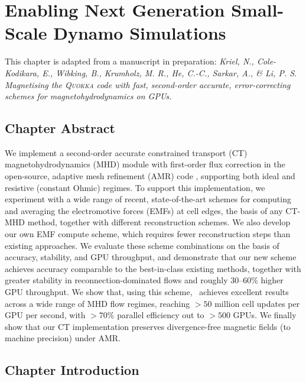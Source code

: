 \chapter{Enabling Next Generation Small-Scale Dynamo Simulations}
\label{chapter:quokka}

\noindent\hfill\parbox{0.75\textwidth}{\raggedleft
This chapter is adapted from a manuscript in preparation:
\textit{Kriel, N., Cole-Kodikara, E., Wibking, B., Krumholz, M. R., He, C.-C., Sarkar, A., \& Li, P. S. Magnetising the \textsc{Quokka} code with fast, second-order accurate, error-correcting schemes for magnetohydrodynamics on GPUs.}
}\par

\section{Chapter Abstract}

We implement a second-order accurate constrained transport (CT) magnetohydrodynamics (MHD) module with first-order flux correction in the open-source, adaptive mesh refinement (AMR) code \quokka, supporting both ideal and resistive (constant Ohmic) regimes. To support this implementation, we experiment with a wide range of recent, state-of-the-art schemes for computing and averaging the electromotive forces (EMFs) at cell edges, the basis of any CT-MHD method, together with different reconstruction schemes. We also develop our own EMF compute scheme, which requires fewer reconstruction steps than existing approaches. We evaluate these scheme combinations on the basis of accuracy, stability, and GPU throughput, and demonstrate that our new scheme achieves accuracy comparable to the best-in-class existing methods, together with greater stability in reconnection-dominated flows and roughly $30$--$60\%$ higher GPU throughput. We show that, using this scheme, \quokka~achieves excellent results across a wide range of MHD flow regimes, reaching $>50$ million cell updates per GPU per second, with $>70\%$ parallel efficiency out to $>500$ GPUs. We finally show that our CT implementation preserves divergence-free magnetic fields (to machine precision) under AMR.

\section{Chapter Introduction}

